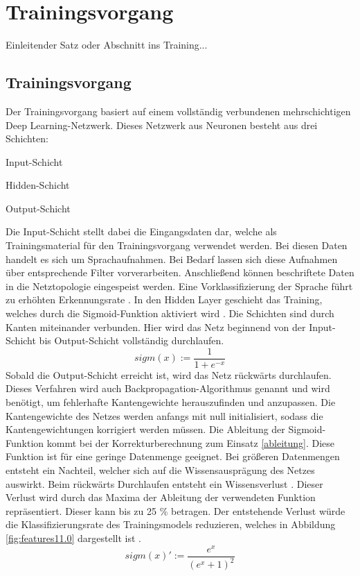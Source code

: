 \section{Trainingsvorgang}
Einleitender Satz oder Abschnitt ins Training...

\subsection{Trainingsvorgang}
Der Trainingsvorgang basiert auf einem vollständig verbundenen mehrschichtigen Deep Learning-Netzwerk. Dieses Netzwerk aus Neuronen besteht aus drei Schichten:
\begin{description}
	\item Input-Schicht
	\item Hidden-Schicht 
	\item Output-Schicht
\end{description}
Die Input-Schicht stellt dabei die Eingangsdaten dar, welche als Trainingsmaterial für den Trainingsvorgang verwendet werden. Bei diesen Daten handelt es sich um Sprachaufnahmen. Bei Bedarf lassen sich diese Aufnahmen über entsprechende Filter vorverarbeiten. Anschließend können beschriftete Daten in die Netztopologie eingespeist werden. Eine Vorklassifizierung der Sprache führt zu erhöhten Erkennungsrate \cite{bishop.2006}. In den Hidden Layer geschieht das Training, welches durch die Sigmoid-Funktion aktiviert wird \cite{bishop.2006}. Die Schichten sind durch Kanten miteinander verbunden. Hier wird das Netz beginnend von der Input-Schicht bis Output-Schicht vollständig durchlaufen.
\begin{equation*}
sigm(x) :=\frac{ 1 }{1+e^{-x}  }
\label{normal}
\end{equation*}
Sobald die Output-Schicht erreicht ist, wird das Netz rückwärts durchlaufen. Dieses Verfahren wird auch Backpropagation-Algorithmus genannt und wird benötigt, um fehlerhafte Kantengewichte herauszufinden und anzupassen. Die Kantengewichte des Netzes werden anfangs mit null initialisiert, sodass die Kantengewichtungen korrigiert werden müssen. Die Ableitung der Sigmoid-Funktion kommt bei der Korrekturberechnung zum Einsatz \ref{ableitung}. Diese Funktion ist für eine geringe Datenmenge geeignet. Bei größeren Datenmengen entsteht ein Nachteil, welcher sich auf die Wissensausprägung des Netzes auswirkt. Beim rückwärts Durchlaufen entsteht ein Wissensverlust \cite{bishop.2006}. Dieser Verlust wird durch das Maxima der Ableitung der verwendeten Funktion repräsentiert. Dieser kann bis zu 25 \% betragen. Der entstehende Verlust würde die Klassifizierungsrate des Trainingsmodels reduzieren, welches in Abbildung \ref{fig:features11.0} dargestellt ist \cite{Kulbear.2017}.
\begin{equation*}
sigm(x)':= \frac{ e^{x} }{(e^{x} +1)^2  }
\label{ableitung}
\end{equation*}

